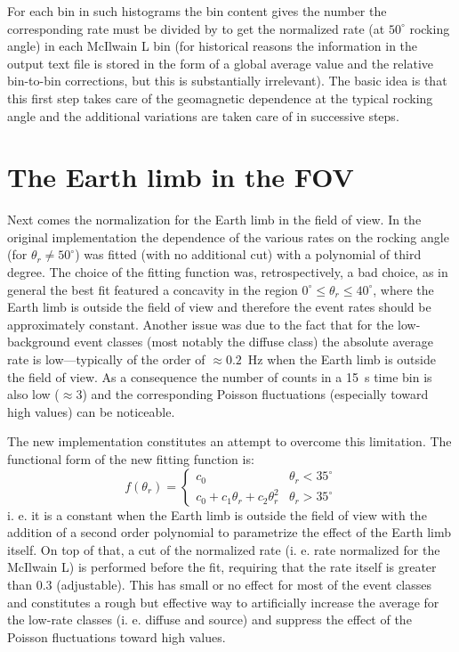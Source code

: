 \documentclass[a4paper,twocolumn]{article}
\begin{document}
For each bin in such histograms the bin content gives the number the
corresponding rate must be divided by to get the normalized rate (at $50^\circ$
rocking angle) in each McIlwain L bin (for historical reasons the information
in the output text file is stored in the form of a global average value and
the relative bin-to-bin corrections, but this is substantially irrelevant).
The basic idea is that this first step takes care of the geomagnetic
dependence at the typical rocking angle and the additional variations are
taken care of in successive steps.

\section{The Earth limb in the FOV}

Next comes the normalization for the Earth limb in the field of view. In the
original implementation the dependence of the various rates on the rocking
angle (for $\theta_r \neq 50^\circ$) was fitted (with no additional cut) with
a polynomial of third degree.
The choice of the fitting function was, retrospectively, a bad choice, as
in general the best fit featured a concavity in the region
$0^\circ \leq \theta_r \leq 40^\circ$, where the Earth limb is outside the
field of view and therefore the event rates should be approximately constant.
Another issue was due to the fact that for the low-background event classes
(most notably the diffuse class) the absolute average rate is low---typically
of the order of $\approx 0.2$~Hz when the Earth limb is outside the field of
view.
As a consequence the number of counts in a 15~s time bin is also low
($\approx 3$) and the corresponding Poisson fluctuations (especially toward
high values) can be noticeable.

The new implementation constitutes an attempt to overcome this limitation. The
functional form of the new fitting function is:
\begin{equation}
  f(\theta_r) =
  \begin{cases}
    c_0 & \theta_r < 35^\circ\\
    c_0 + c_1 \theta_r + c_2 \theta_r^2 & \theta_r > 35^\circ
  \end{cases}
\end{equation}
i. e. it is a constant when the Earth limb is outside the field of view with the
addition of a second order polynomial to parametrize the effect of the Earth
limb itself. On top of that, a cut of the normalized rate (i. e. rate normalized
for the McIlwain L) is performed before the fit, requiring that the rate itself
is greater than 0.3 (adjustable). This has small or no effect for most of the
event classes and constitutes a rough but effective way to artificially
increase the average for the low-rate classes (i. e. diffuse and source) and
suppress the effect of the Poisson fluctuations toward high values.
\end{document}
